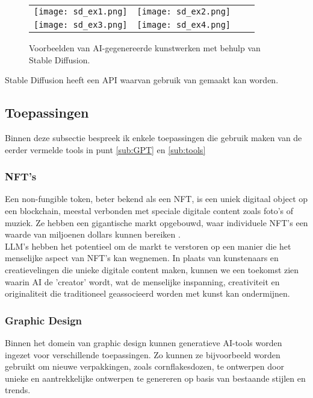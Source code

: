 \begin{figure}[h!]
    \centering
    \begin{tabular}{llll}
        \texttt{[image: sd\_ex1.png]} &
        \texttt{[image: sd\_ex2.png]} \\
        \texttt{[image: sd\_ex3.png]} &
        \texttt{[image: sd\_ex4.png]}
    \end{tabular}
    \caption{Voorbeelden van AI-gegenereerde kunstwerken met behulp van Stable Diffusion.}
    \label{fig:examples}
\end{figure}

Stable Diffusion heeft een API waarvan gebruik van gemaakt kan worden. \\

\pagebreak

\subsection{Toepassingen}
Binnen deze subsectie bespreek ik enkele toepassingen die gebruik maken van de eerder vermelde tools in punt \ref{sub:GPT} en \ref{sub:tools}

\subsubsection{NFT's}
Een non-fungible token, beter bekend als een NFT, is een uniek digitaal object op een blockchain, meestal verbonden met speciale digitale content zoals foto's of muziek. Ze hebben een gigantische markt opgebouwd, waar individuele NFT's een waarde van miljoenen dollars kunnen bereiken \autocite{nft_whatisit}. \\

LLM's hebben het potentieel om de markt te verstoren op een manier die het menselijke aspect van NFT's kan wegnemen. In plaats van kunstenaars en creatievelingen die unieke digitale content maken, kunnen we een toekomst zien waarin AI de 'creator' wordt, wat de menselijke inspanning, creativiteit en originaliteit die traditioneel geassocieerd worden met kunst kan ondermijnen. 

\subsubsection{Graphic Design}
Binnen het domein van graphic design kunnen generatieve AI-tools worden ingezet voor verschillende toepassingen. Zo kunnen ze bijvoorbeeld worden gebruikt om nieuwe verpakkingen, zoals cornflakesdozen, te ontwerpen door unieke en aantrekkelijke ontwerpen te genereren op basis van bestaande stijlen en trends.  \\

